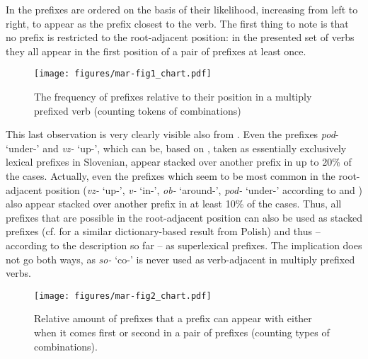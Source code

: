 \documentclass[output=paper,colorlinks,citecolor=brown]{langscibook}
\begin{document}
In  the prefixes are ordered on the basis of their likelihood, increasing from left to right, to appear as the prefix closest to the verb. The first thing to note is that no prefix is restricted to the root-adjacent position: in the presented set of verbs they all appear in the first position of a pair of prefixes at least once.

\begin{figure}    
\centering
\texttt{[image: figures/mar-fig1\_chart.pdf]}
\caption{The frequency of prefixes relative to their position in a multiply prefixed verb (counting tokens of combinations)}
\label{mar+:fig:1}
\end{figure}

This last observation is very clearly visible also from . Even the prefixes \textit{pod}- `under-' and \textit{vz-} `up-', which can be, based on \citet{sekli2016pomeni}, taken as essentially exclusively lexical prefixes in Slovenian, appear stacked over another prefix in up to 20\% of the cases. Actually, even the prefixes which seem to be most common in the root-adjacent position (\textit{vz-} `up-', \textit{v-} `in-', \textit{ob-} `around-', \textit{pod-} `under-' according to  and ) also appear stacked over another prefix in at least 10\% of the cases. Thus, all prefixes that are possible in the root-adjacent position can also be used as stacked prefixes (cf. \citealt{lazinski2011} for a similar dictionary-based result from Polish) and thus -- according to the description so far -- as superlexical prefixes. The implication does not go both ways, as \textit{so-} `co-' is never used as verb-adjacent in multiply prefixed verbs. 

\begin{figure}
\centering
\texttt{[image: figures/mar-fig2\_chart.pdf]}
\caption{Relative amount of prefixes that a prefix can appear with either when it comes first or second in a pair of prefixes (counting types of combinations).}
\label{fig:3}
\end{figure}

\end{document}
